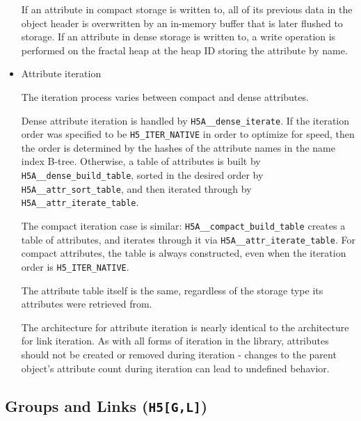 \begin{itemize}
If an attribute in compact storage is written to, all of its previous data in the object header is overwritten by an in-memory buffer that is later flushed to storage. If an attribute in dense storage is written to, a write operation is performed on the fractal heap at the heap ID storing the attribute by name. 

    \item Attribute iteration

The iteration process varies between compact and dense attributes.

Dense attribute iteration is handled by \texttt{H5A\_\_dense\_iterate}. If the iteration order was specified to be \texttt{H5\_ITER\_NATIVE} in order to optimize for speed, then the order is determined by the hashes of the attribute names in the name index B-tree. Otherwise, a table of attributes is built by \texttt{H5A\_\_dense\_build\_table}, sorted in the desired order by \texttt{H5A\_\_attr\_sort\_table}, and then iterated through by \texttt{H5A\_\_attr\_iterate\_table}.

The compact iteration case is similar: \texttt{H5A\_\_compact\_build\_table} creates a table of attributes, and iterates through it via \texttt{H5A\_\_attr\_iterate\_table}. For compact attributes, the table is always constructed, even when the iteration order is \texttt{H5\_ITER\_NATIVE}. 

The attribute table itself is the same, regardless of the storage type its attributes were retrieved from.

The architecture for attribute iteration is nearly identical to the architecture for link iteration. As with all forms of iteration in the library, attributes should not be created or removed during iteration - changes to the parent object's attribute count during iteration can lead to undefined behavior.

\end{itemize}

\subsection{Groups and Links (\texttt{H5[G,L]})}


